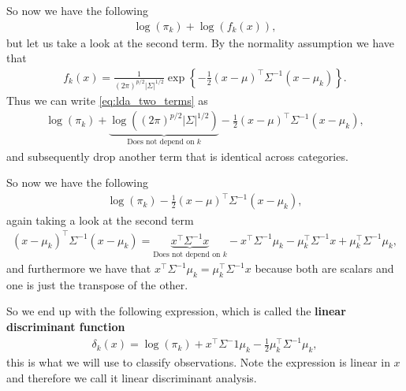\documentclass[aspectratio=169,10pt]{beamer}
\begin{document}
\begin{frame}{\secname}{\subsecname}
  So now we have the following
  \begin{align}
    \log(\pi_k) + \log(f_k(x)), \label{eq:lda_two_terms}
  \end{align}
  but let us take a look at the second term.
  By the normality assumption we have that
  \begin{align}
    f_k(x) = \frac{1}{(2\pi)^{p/2} |\Sigma|^{1/2}} \exp\left\{
      -\frac{1}{2}(x - \mu)^\top\Sigma^{-1}(x - \mu_k)
    \right\}.
  \end{align}
  Thus we can write \eqref{eq:lda_two_terms} as
  \begin{align}
    \log(\pi_k) + \underbrace{\log((2\pi)^{p/2} |\Sigma|^{1/2})}_{\text{Does not depend on $k$}} - \frac{1}{2}(x - \mu)^\top\Sigma^{-1}(x - \mu_k), 
  \end{align}
  and subsequently drop another term that is identical across categories.
\end{frame}

\begin{frame}{\secname}{\subsecname}
  So now we have the following
  \begin{align}
    \log(\pi_k) - \frac{1}{2}(x - \mu)^\top\Sigma^{-1}(x - \mu_k), \label{eq:lda_another_two_terms}
  \end{align}
  again taking a look at the second term
  \begin{align}
    (x - \mu_k)^\top\Sigma^{-1}(x - \mu_k) = \underbrace{x^\top\Sigma^{-1}x}_{\text{Does not depend on $k$}} - x^\top\Sigma^{-1}\mu_k - \mu_k^\top \Sigma^{-1}x + \mu_k^\top \Sigma^{-1}\mu_k, 
  \end{align}
  and furthermore we have that $x^\top\Sigma^{-1}\mu_k = \mu_k^\top \Sigma^{-1}x$ because both are scalars and one is just the transpose of the other.
\end{frame}

\begin{frame}{\secname}{\subsecname}
  So we end up with the following expression, which is called the \textbf{linear discriminant function}
  \begin{align}
    \delta_k(x) = \log(\pi_k) + x^\top \Sigma^-1 \mu_k - \frac{1}{2}\mu_k^\top \Sigma^{-1} \mu_k,
  \end{align}
  this is what we will use to classify observations.
  Note the expression is linear in $x$ and therefore we call it linear discriminant analysis.
\end{frame}
\end{document}
